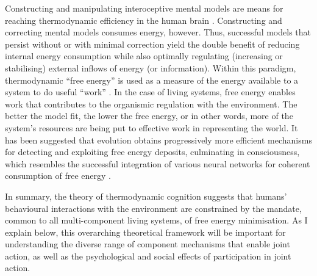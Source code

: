 \begin{CJK}{UTF8}{gbsn}
Constructing and manipulating interoceptive mental models are means for reaching thermodynamic efficiency in the human brain \citep{Yufik2013}. Constructing and correcting mental models consumes energy, however.  Thus, successful models that persist without or with minimal correction yield the double benefit of reducing internal energy consumption while also optimally regulating (increasing or stabilising) external inflows of energy (or information).  Within this paradigm, thermodynamic ``free energy'' is used as a measure of the energy available to a system to do useful ``work'' \citep{Stoner2000}.  In the case of living systems, free energy enables work that contributes to the organismic regulation with the environment. The better the model fit, the lower the free energy, or in other words, more of the system's resources are being put to effective work in representing the world.  It has been suggested that evolution obtains progressively more efficient mechanisms for detecting and exploiting free energy deposits, culminating in consciousness, which resembles the successful integration of various neural networks for coherent consumption of free energy \citep{Annila2016}.

In summary, the theory of thermodynamic cognition suggests that humans' behavioural interactions with the environment are constrained by the mandate, common to all multi-component living systems, of free energy minimisation.  As I explain below, this overarching theoretical framework will be important for understanding the diverse range of component mechanisms that enable joint action, as well as the psychological and social effects of participation in joint action.


\end{CJK}
